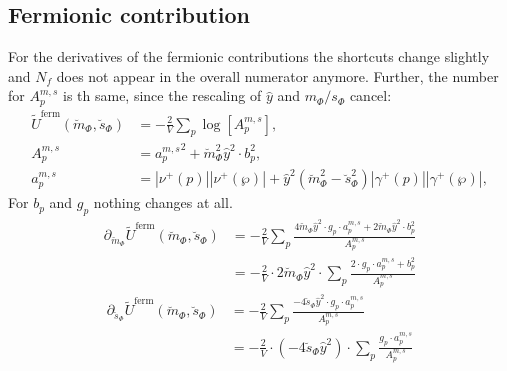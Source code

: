 \subsection*{Fermionic contribution}
For the derivatives of the fermionic contributions the shortcuts change slightly and $N_f$ does not appear in the overall numerator anymore. Further, the number 
for $A_p^{m,s}$ is th same, since the rescaling of $\hat y$ and $m_{\Phi}/s_{\Phi}$ cancel:
\begin{align}\label{eq:CEP_ferionicContribution_shortcuts_rescaled}
 \tilde U^{\text{ferm}}(\breve m_{\Phi}, \breve s_{\Phi}) & = - \frac{2}{V} \sum\limits_p \log\left[{A_p^{m, s}}\right],
%  
          \\ \label{eq:CEP_ferionicContribution_shortcuts_A_rescaled}
 {A_p^{m, s}} &= {a_p^{m,s}}^2 +  \breve m_{\Phi}^2 \hat y^2 \cdot b_p^2 ,
%  
          \\ \label{eq:CEP_ferionicContribution_shortcuts_a_rescaled}
 {a_p^{m,s}} &= |\nu^+(p)| |\nu^+(\wp)|   +   \hat y ^2 \left( \breve m_{\Phi}^2 - \breve s_{\Phi}^2 \right) |\gamma^+(p)| |\gamma^+(\wp)|,
\end{align}
For $b_p$ and $g_p$ nothing changes at all.
% 
\begin{align}\label{eq:CEP_derivative_dm_fermionicContribution_rescaled}
 \partial_{\breve m_{\Phi}}  \tilde U^{\text{ferm}}(\breve m_{\Phi}, \breve s_{\Phi}) & =
                                -\frac{2}{V} \sum\limits_p \frac{4 \breve m_{\Phi} \hat y^2 \cdot g_p \cdot {a_p^{m,s}}  
                                +  2 \breve m_{\Phi} \hat y^2 \cdot b_p^2} { {A_p^{m, s}} } 
       \nonumber \\
                              & = - \frac{2}{V} \cdot 2 \breve m_{\Phi} \hat y^2 \cdot \sum\limits_p 
                                  \frac{2 \cdot g_p \cdot {a_p^{m,s}} + b_p^2}{ {A_p^{m, s}} }
\end{align} 
% 
\begin{align}\label{eq:CEP_derivative_ds_fermionicContribution_rescaled}
 \partial_{\breve s_{\Phi}}  \tilde U^{\text{ferm}}(\breve m_{\Phi}, \breve s_{\Phi}) &= 
                              - \frac{2}{V} \sum\limits_p \frac{- 4 \breve s_{\Phi} \hat y^2 \cdot g_p \cdot {a_p^{m,s}} }{ {A_p^{m, s}} } 
       \nonumber \\
                            & = - \frac{2}{V} \cdot \left( -4 \breve s_{\Phi} \hat y^2\right) \cdot \sum\limits_p 
                                \frac{ g_p \cdot {a_p^{m,s}} }{ {A_p^{m, s}} }
\end{align} 
